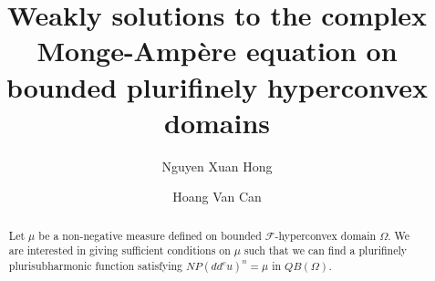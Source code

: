 \documentclass[3p,times]{elsarticle}
\numberwithin{equation}{section}
\newtheorem{The main theorem}[theorem]{The main theorem}
\theoremstyle{definition}
\begin{document}
\begin{frontmatter}




\title {Weakly solutions to the complex Monge-Amp\`ere equation  on bounded  plurifinely hyperconvex domains}


 


\author[label1]{Nguyen Xuan Hong
}%
 \address[label1]{Department of Mathematics, Hanoi National University of Education, 136 Xuan Thuy Street, Cau Giay District, Hanoi, Vietnam} 
 \author[label3]{Hoang Van Can} \address[label3]{Department of Basis Sciences, University of Transport Technology, 54 Trieu Khuc, Thanh Xuan District, Hanoi, Vietnam}   



\begin{abstract}
Let  $\mu$ be a  non-negative measure  defined on bounded $\mathcal F$-hyperconvex domain $\Omega$.  We are interested in giving sufficient conditions on $\mu$ such that  we can find  a plurifinely plurisubharmonic function  satisfying  $NP (dd^c u)^n =\mu$ in $QB(\Omega)$. 
\end{abstract}


\end{frontmatter}
\end{document}

